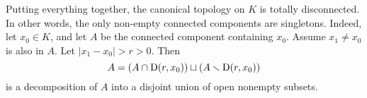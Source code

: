 \subsubsection{}
Putting everything together, the canonical topology on $K$ is totally 
disconnected. In other words, the only non-empty connected components are 
singletons. Indeed, let $x_0\in K$, and let $A$ be the connected component 
containing $x_0$. Assume $x_1\ne x_0$ is also in $A$. Let 
$|x_1-x_0|>r>0$. Then 
\[
  A = \left(A\cap \operatorname{D}(r,x_0)\right) \sqcup \left(A\smallsetminus \operatorname{D}(r,x_0)\right) 
\]
is a decomposition of $A$ into a disjoint union of open nonempty subsets. 





